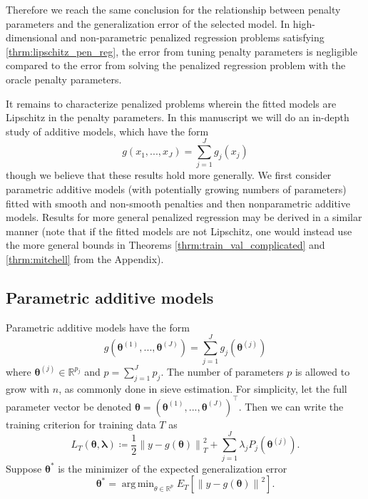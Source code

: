 \documentclass[12pt]{article} %
\theoremstyle{definition}
\DeclareMathOperator*{\argmin}{arg\,min}
\begin{document}
Therefore we reach the same conclusion for the relationship between penalty parameters and the generalization error of the selected model. In high-dimensional and non-parametric penalized regression problems satisfying \eqref{thrm:lipschitz_pen_reg}, the error from tuning penalty parameters is negligible compared to the error from solving the penalized regression problem with the oracle penalty parameters.

It remains to characterize penalized problems wherein the fitted models are Lipschitz in the penalty parameters. In this manuscript we will do an in-depth study of additive models, which have the form
\begin{equation}
g(x_1, ..., x_J)= \sum_{j=1}^J g_j(x_j)
\end{equation}
though we believe that these results hold more generally. We first consider parametric additive models (with potentially growing numbers of parameters) fitted with smooth and non-smooth penalties and then nonparametric additive models. Results for more general penalized regression may be derived in a similar manner (note that if the fitted models are not Lipschitz, one would instead use the more general bounds in Theorems \ref{thrm:train_val_complicated} and \ref{thrm:mitchell} from the Appendix).

\subsection{Parametric additive models}
\label{sec:param_add_models}
Parametric additive models have the form
\begin{equation}
g(\boldsymbol{\theta}^{(1)}, ..., \boldsymbol{\theta}^{(J)}) = \sum_{j=1}^J g_j(\boldsymbol{\theta}^{(j)})
\end{equation}
where $\boldsymbol{\theta}^{(j)} \in \mathbb{R}^{p_j}$ and $p = \sum_{j=1}^J p_j$. The number of parameters $p$ is allowed to grow with $n$, as commonly done in sieve estimation. For simplicity, let the full parameter vector be denoted $\boldsymbol{\theta} = \left (\boldsymbol{\theta}^{(1)}, ..., \boldsymbol{\theta}^{(J)} \right )^\top$. Then we can write the training criterion for training data $T$ as
\begin{equation}
\label{eq:param_add}
L_T \left (\boldsymbol{\theta}, \boldsymbol{\lambda} \right) 
\coloneqq \frac{1}{2} \left  \| y -  g(\boldsymbol{\theta}) \right \|^2_T 
+ \sum_{j=1}^J \lambda_j P_j(\boldsymbol{\theta}^{(j)}).
\end{equation}
Suppose $\boldsymbol{\theta}^*$ is the minimizer of the expected generalization error
\begin{equation}
\boldsymbol{\theta}^* = \argmin_{\theta \in \mathbb{R}^p} E_T \left [ \left \| y - g(\boldsymbol{\theta}) \right\|^2 \right ].
\end{equation}
\end{document}
